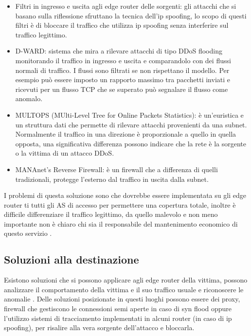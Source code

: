 \begin{itemize}
    \item Filtri in ingresso e uscita agli edge router delle sorgenti: gli attacchi che si basano sulla riflessione sfruttano la tecnica dell'ip spoofing, lo scopo di questi filtri è di bloccare il traffico che utilizza ip spoofing senza interferire sul traffico legittimo.
    \item D-WARD: sistema che mira a rilevare attacchi di tipo DDoS flooding monitorando il traffico in ingresso e uscita e comparandolo con dei flussi normali di traffico. I flussi sono filtrati se non rispettano il modello. Per esempio può essere imposto un rapporto massimo tra pacchetti inviati e ricevuti per un flusso TCP che se superato può segnalare il flusso come anomalo.
    \item MULTOPS (MUlti-Level Tree for Online Packets Statistics): è un'euristica e un struttura dati che permette di rilevare attacchi provenienti da una subnet. Normalmente il traffico in una direzione è proporzionale a quello in quella opposta, una significativa differenza possono indicare che la rete è la sorgente o la vittima di un attacco DDoS.
    \item MANAnet’s Reverse Firewall: è un firewall che a differenza di quelli tradizionali, protegge l'esterno dal traffico in uscita dalla subnet.
\end{itemize}

I problemi di questa soluzione sono che dovrebbe essere implementata su gli edge router ti tutti gli AS di accesso per permettere una copertura totale, inoltre è difficile differenziare il traffico legittimo, da quello malevolo e non meno importante non è chiaro chi sia il responsabile del mantenimento economico di questo servizio \cite{ddos_survey_1}.

\subsection{Soluzioni alla destinazione}

Esistono soluzioni che si possono applicare agli edge router della vittima, possono analizzare il comportamento della vittima e il suo traffico usuale e riconoscere le anomalie \cite{ddos_survey_1,ddos_survey_2}.
Delle soluzioni posizionate in questi luoghi possono essere dei proxy, firewall che gestiscono le connessioni semi aperte in caso di syn flood oppure l'utilizzo sistemi di tracciamento implementati in alcuni router (in caso di ip spoofing), per risalire alla vera sorgente dell'attacco e bloccarla. %

